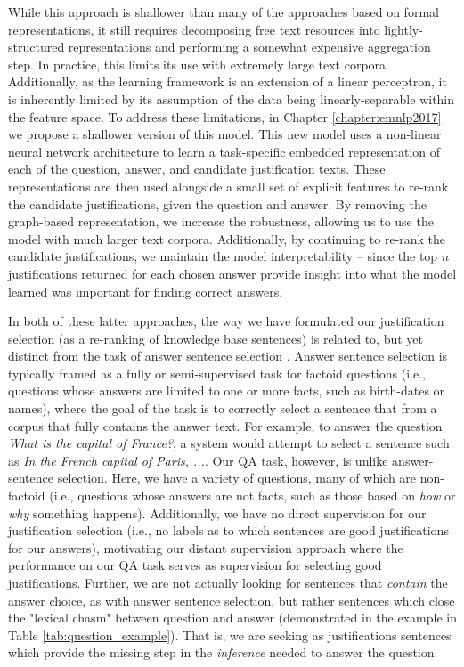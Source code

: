 While this approach is shallower than many of the approaches based on formal representations, it still requires decomposing free text resources into lightly-structured representations and performing a somewhat expensive aggregation step.  In practice, this limits its use with extremely large text corpora.  Additionally, as the learning framework is an extension of a linear perceptron, it is inherently limited by its assumption of the data being linearly-separable within the feature space.  To address these limitations, in Chapter \ref{chapter:emnlp2017} we propose a shallower version of this model.  This new model uses a non-linear neural network architecture to learn a task-specific embedded representation of each of the question, answer, and candidate justification texts.  These representations are then used alongside a small set of explicit features to re-rank the candidate justifications, given the question and answer.  By removing the graph-based representation, we increase the robustness, allowing us to use the model with much larger text corpora.   Additionally, by continuing to re-rank the candidate justifications, we maintain the model interpretability -- since the top $n$ justifications returned for each chosen answer provide insight into what the model learned was important for finding correct answers.

In both of these latter approaches, the way we have formulated our justification selection (as a re-ranking of knowledge base sentences) is related to, but yet distinct from the task of answer sentence selection \cite[][inter alia]{Wang2010ProbabilisticTM, Severyn:12,Severyn:13a,Severyn:13b,Severyn2015LearningTR,wang2015long}.  Answer sentence selection is typically framed as a fully or semi-supervised task for factoid questions (i.e., questions whose answers are limited to one or more facts, such as birth-dates or names), where the goal of the task is to correctly select a sentence that from a corpus that fully contains the answer text.  For example, to answer the question \textit{What is the capital of France?}, a system would attempt to select a sentence such as \textit{In the French capital of Paris, ...}.
Our QA task, however, is unlike answer-sentence selection.  Here, we have a variety of questions, many of which are non-factoid (i.e., questions whose answers are not facts, such as those based on \textit{how} or \textit{why} something happens).  Additionally, we have no direct supervision for our justification selection (i.e., no labels as to which sentences are good justifications for our answers), motivating our distant supervision approach where the performance on our QA task serves as supervision for selecting good justifications.  Further, we are not actually looking for sentences that \emph{contain} the answer choice, as with answer sentence selection, but rather sentences which close the "lexical chasm" \citep{Berger:00} between question and answer (demonstrated in the example in Table \ref{tab:question_example}).  That is, we are seeking as justifications sentences which provide the missing step in the \emph{inference} needed to answer the question.
